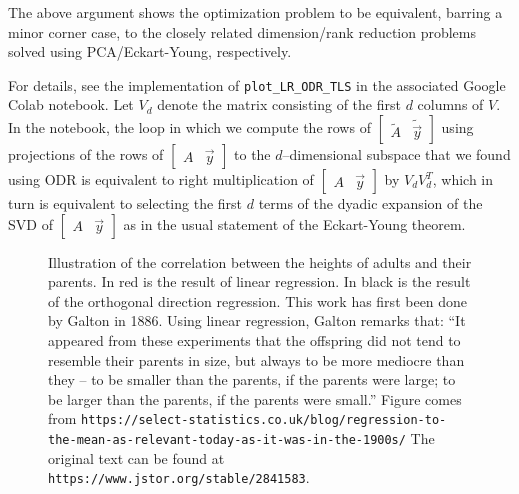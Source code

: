 \documentclass[10pt]{article}
\begin{document}
\begin{enumerate}[label=(\alph*), start=8]
The above argument shows the optimization problem to be equivalent, barring a minor corner case, to the closely related dimension/rank reduction problems solved using PCA/Eckart-Young, respectively.

For details, see the implementation of \texttt{plot\_LR\_ODR\_TLS} in the associated Google Colab notebook. Let $V_d$ denote the matrix consisting of the first $d$ columns of $V$. In the notebook, the loop in which we compute the rows of $\begin{bmatrix} \tilde{A} & \tilde{\vec{y}} \end{bmatrix}$ using projections of the rows of $\begin{bmatrix} A & \vec{y} \end{bmatrix}$ to the $d$--dimensional subspace that we found using ODR is equivalent to right multiplication of $\begin{bmatrix} A & \vec{y} \end{bmatrix}$ by $V_d V_d^T$, which in turn is equivalent to selecting the first $d$ terms of the dyadic expansion of the SVD of $\begin{bmatrix} A & \vec{y} \end{bmatrix}$ as in the usual statement of the Eckart-Young theorem.
\end{enumerate}

\begin{figure}[ht]
\centering
{}
\caption{Illustration of the correlation between the heights of adults and their parents. In red is the result of linear regression. In black is the result of the orthogonal direction regression. This work has first been done by Galton in 1886. Using linear regression, Galton remarks that: ``It appeared from these experiments that the offspring did not tend to resemble their parents in size, but always to be more mediocre than they -- to be smaller than the parents, if the parents were large; to be larger than the parents, if the parents were small.'' Figure comes from \texttt{https://select-statistics.co.uk/blog/regression-to-the-mean-as-relevant-today-as-it-was-in-the-1900s/} The original text can be found at \texttt{https://www.jstor.org/stable/2841583}.}
\label{fig:galton}
\end{figure}
\end{document}
